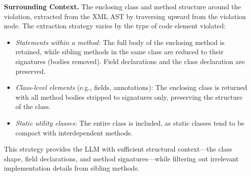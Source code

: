 \documentclass[conference]{IEEEtran}
\begin{document}
\textbf{Surrounding Context.} The enclosing class and method structure 
around the violation, extracted from the XML AST by traversing upward 
from the violation node. The extraction strategy varies by the type of 
code element violated:

\begin{itemize}
\item \textit{Statements within a method:} The full body of the 
enclosing method is retained, while sibling methods in the same class 
are reduced to their signatures (bodies removed). Field declarations 
and the class declaration are preserved.
\item \textit{Class-level elements} (e.g., fields, annotations): The 
enclosing class is returned with all method bodies stripped to 
signatures only, preserving the structure of the class.
\item \textit{Static utility classes:} The entire class is included, 
as static classes tend to be compact with interdependent methods.
\end{itemize}

\noindent This strategy provides the LLM with sufficient structural 
context---the class shape, field declarations, and method 
signatures---while filtering out irrelevant implementation details from 
sibling methods. %

\end{document}
